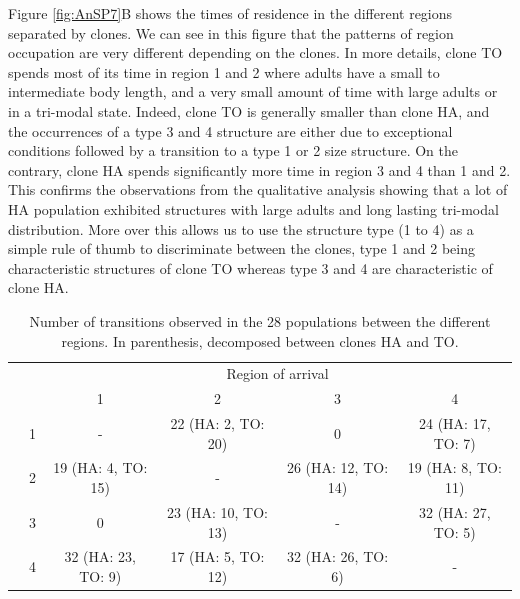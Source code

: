 Figure \ref{fig:AnSP7}B shows the times of residence in the different regions separated by
clones. We can see in this figure that the patterns of region occupation are
very different depending on the clones. In more details, clone TO spends most of
its time in region 1 and 2 where adults have a small to intermediate body
length, and a very small amount of time with large adults or in a tri-modal
state. Indeed, clone TO is generally smaller than clone HA, and the occurrences
of a type 3 and 4 structure are either due to exceptional conditions followed by
a transition to a type 1 or 2 size structure. On the contrary, clone HA spends
significantly more time in region 3 and 4 than 1 and 2. This confirms the
observations from the qualitative analysis showing that a lot of HA population
exhibited structures with large adults and long lasting tri-modal distribution.
More over this allows us to use the structure type (1 to 4) as a simple rule of
thumb to discriminate between the clones, type 1 and 2 being characteristic
structures of clone TO whereas type 3 and 4 are characteristic of clone HA.


\begin{table}
\centering
\caption{\label{tab:AnSP2}Number of transitions observed in the 28 populations between the different regions. In parenthesis, decomposed between clones HA and TO.}
\renewcommand{\arraystretch}{1.5}%
\begin{tabular}{|rr|cccc|}
\hline 
	&  & & \multicolumn{2}{c}{Region of arrival}  & \\	
	&	& 1 & 2 & 3 & 4 \\
\hline
\parbox[t]{2mm}{} &
1 & - & 22 (HA: 2, TO: 20) & 0 & 24 (HA: 17, TO: 7) \\
 & 2 & 19 (HA: 4, TO: 15) & - & 26 (HA: 12, TO: 14) & 19 (HA: 8,
TO: 11)\\
 & 3 & 0 & 23 (HA: 10, TO: 13) & - & 32 (HA: 27, TO: 5) \\
 & 4 & 32 (HA: 23, TO: 9) & 17 (HA: 5, TO: 12) & 32 (HA: 26, TO: 6)
& -\\
	
\hline

\end{tabular} 
\end{table}

